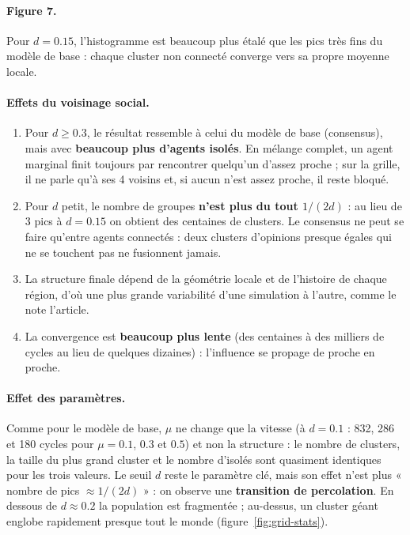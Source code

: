 \documentclass[11pt,a4paper]{article}
\begin{document}
\paragraph{Figure 7.} Pour $d = 0.15$, l'histogramme est beaucoup plus étalé que les pics
très fins du modèle de base : chaque cluster non connecté converge vers sa propre moyenne
locale.

\paragraph{Effets du voisinage social.}
\begin{enumerate}
  \item Pour $d \ge 0.3$, le résultat ressemble à celui du modèle de base (consensus), mais
  avec \textbf{beaucoup plus d'agents isolés}. En mélange complet, un agent marginal finit
  toujours par rencontrer quelqu'un d'assez proche ; sur la grille, il ne parle qu'à ses
  4 voisins et, si aucun n'est assez proche, il reste bloqué.
  \item Pour $d$ petit, le nombre de groupes \textbf{n'est plus du tout $1/(2d)$} : au lieu
  de 3 pics à $d = 0.15$ on obtient des centaines de clusters. Le consensus ne peut se faire
  qu'entre agents connectés : deux clusters d'opinions presque égales qui ne se touchent pas
  ne fusionnent jamais.
  \item La structure finale dépend de la géométrie locale et de l'histoire de chaque région,
  d'où une plus grande variabilité d'une simulation à l'autre, comme le note l'article.
  \item La convergence est \textbf{beaucoup plus lente} (des centaines à des milliers de
  cycles au lieu de quelques dizaines) : l'influence se propage de proche en proche.
\end{enumerate}

\paragraph{Effet des paramètres.} Comme pour le modèle de base, $\mu$ ne change que la
vitesse (à $d = 0.1$ : 832, 286 et 180 cycles pour $\mu = 0.1$, $0.3$ et $0.5$) et non la
structure : le nombre de clusters, la taille du plus grand cluster et le nombre d'isolés sont
quasiment identiques pour les trois valeurs. Le seuil $d$ reste le paramètre clé, mais son
effet n'est plus « nombre de pics $\approx 1/(2d)$ » : on observe une \textbf{transition de
percolation}. En dessous de $d \approx 0.2$ la population est fragmentée ; au-dessus, un
cluster géant englobe rapidement presque tout le monde (figure~\ref{fig:grid-stats}).
\end{document}
